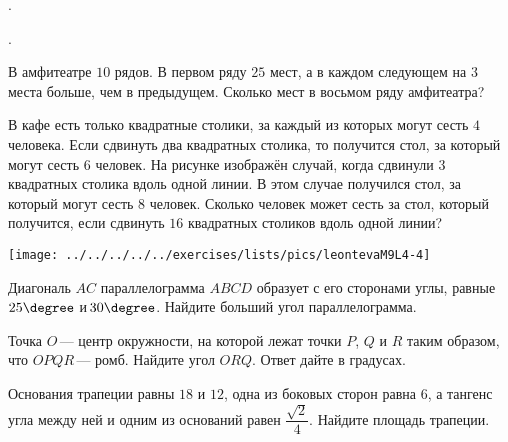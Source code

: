 \begin{class}[number=7]
	\begin{listofex}
		\item .
	\end{listofex}
\end{class}

\begin{class}[number=8]
	\begin{listofex}
		\item .
	\end{listofex}
\end{class}

\begin{homework}[number=4]
	\begin{listofex}
		\item В амфитеатре \( 10 \) рядов. В первом ряду \( 25 \) мест, а в каждом следующем на \( 3 \) места больше, чем в предыдущем. Сколько мест в восьмом ряду амфитеатра?
		\item 
		\begin{minipage}[t]{\bodywidth}
			В кафе есть только квадратные столики, за каждый из которых могут сесть \( 4 \) человека. Если сдвинуть два квадратных столика, то получится стол, за который могут сесть \( 6 \) человек. На рисунке изображён случай, когда сдвинули \( 3 \) квадратных столика вдоль одной линии. В этом случае получился стол, за который могут сесть \( 8 \) человек. Сколько человек может сесть за стол, который получится, если сдвинуть \( 16 \) квадратных столиков вдоль одной линии?
		\end{minipage}
		\hspace{0.02\linewidth}
		\begin{minipage}[t]{\picwidth}
			\texttt{[image: ../../../../../exercises/lists/pics/leontevaM9L4-4]}
		\end{minipage}
		\item Диагональ \( AC \) параллелограмма \( ABCD \) образует с его сторонами углы, равные \( 25\degree \) и \( 30\degree \). Найдите больший угол параллелограмма.
		\item Точка \( O \) --- центр окружности, на которой лежат точки \( P \), \( Q \) и \( R \) таким образом, что \( OPQR \) --- ромб. Найдите угол \( ORQ \). Ответ дайте в градусах.
		\item Основания трапеции равны \( 18 \) и \( 12 \), одна из боковых сторон равна \( 6 \), а тангенс угла между ней и одним из оснований равен \( \dfrac{\sqrt{2}}{4} \).  Найдите площадь трапеции.

\end{listofex}
\end{homework}
